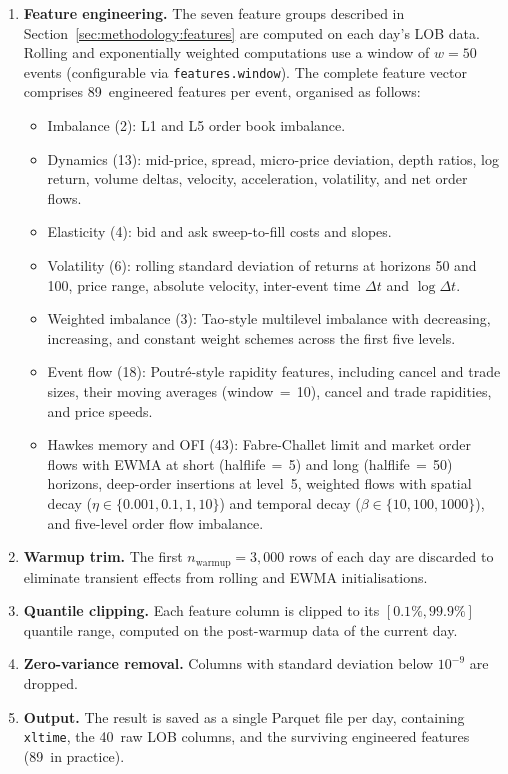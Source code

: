 \documentclass[11pt]{report}
\begin{document}
\begin{enumerate}
\item \textbf{Feature engineering.} The seven feature groups described in Section~\ref{sec:methodology:features} are computed on each day's LOB data. Rolling and exponentially weighted computations use a window of $w = 50$ events (configurable via \texttt{features.window}). The complete feature vector comprises 89~engineered features per event, organised as follows:
  \begin{itemize}
    \item Imbalance (2): L1 and L5 order book imbalance.
    \item Dynamics (13): mid-price, spread, micro-price deviation, depth ratios, log return, volume deltas, velocity, acceleration, volatility, and net order flows.
    \item Elasticity (4): bid and ask sweep-to-fill costs and slopes.
    \item Volatility (6): rolling standard deviation of returns at horizons 50 and 100, price range, absolute velocity, inter-event time $\Delta t$ and $\log \Delta t$.
    \item Weighted imbalance (3): Tao-style multilevel imbalance with decreasing, increasing, and constant weight schemes across the first five levels.
    \item Event flow (18): Poutr\'e-style rapidity features, including cancel and trade sizes, their moving averages (window\,$=$\,10), cancel and trade rapidities, and price speeds.
    \item Hawkes memory and OFI (43): Fabre-Challet limit and market order flows with EWMA at short (halflife\,$=$\,5) and long (halflife\,$=$\,50) horizons, deep-order insertions at level~5, weighted flows with spatial decay ($\eta \in \{0.001, 0.1, 1, 10\}$) and temporal decay ($\beta \in \{10, 100, 1000\}$), and five-level order flow imbalance.
  \end{itemize}

\item \textbf{Warmup trim.} The first $n_{\text{warmup}} = 3{,}000$ rows of each day are discarded to eliminate transient effects from rolling and EWMA initialisations.

\item \textbf{Quantile clipping.} Each feature column is clipped to its $[0.1\%, 99.9\%]$ quantile range, computed on the post-warmup data of the current day.

\item \textbf{Zero-variance removal.} Columns with standard deviation below $10^{-9}$ are dropped.

\item \textbf{Output.} The result is saved as a single Parquet file per day, containing \texttt{xltime}, the 40~raw LOB columns, and the surviving engineered features (89~in practice).
\end{enumerate}
\end{document}
